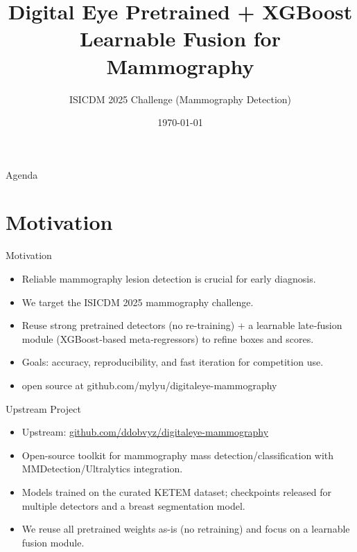 \documentclass[aspectratio=169]{beamer}
\title[github.com/mylyu/digitaleye-mammography]{Digital Eye Pretrained + XGBoost Learnable Fusion for Mammography}
\subtitle{ISICDM 2025 Challenge (Mammography Detection)}
\author{} %
\institute{} %
\date{\today}
\begin{document}
\begin{frame}
  \titlepage
\end{frame}

\begin{frame}{Agenda}
  \tableofcontents
\end{frame}

\section{Motivation}

\begin{frame}{Motivation}
  \begin{itemize}
    \item Reliable mammography \alert{lesion detection} is crucial for early diagnosis.
    \item We target the \alert{ISICDM 2025} mammography challenge.
    \item Reuse strong \alert{pretrained detectors} (no re-training) + a learnable late‑fusion module (XGBoost‑based meta‑regressors) to refine boxes and scores.
    \item Goals: \alert{accuracy}, \alert{reproducibility}, and \alert{fast iteration} for competition use.
    \item open source at github.com/mylyu/digitaleye-mammography

  \end{itemize}
\end{frame}

\begin{frame}{Upstream Project}
  \begin{itemize}
    \item Upstream: \href{https://github.com/ddobvyz/digitaleye-mammography}{github.com/ddobvyz/digitaleye-mammography}
    \item Open-source toolkit for mammography \alert{mass detection/classification} with MMDetection/Ultralytics integration.
    \item Models trained on the curated \alert{KETEM} dataset; checkpoints released for multiple detectors and a breast segmentation model.
    \item We reuse all \alert{pretrained weights} as-is (no retraining) and focus on a learnable fusion module.
  \end{itemize}
\end{frame}
\end{document}
